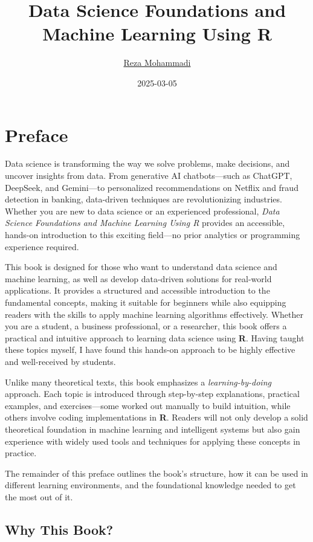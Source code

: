 \documentclass[
]{book}
\title{Data Science Foundations and Machine Learning Using R}
\author{\href{https://www.uva.nl/profile/a.mohammadi}{{Reza Mohammadi}}}
\date{2025-03-05}
\theoremstyle{definition}
\theoremstyle{definition}
\theoremstyle{definition}
\theoremstyle{definition}
\theoremstyle{remark}
\begin{document}
\maketitle

{
\setcounter{tocdepth}{1}
\tableofcontents
}
\chapter*{Preface}\label{preface}

Data science is transforming the way we solve problems, make decisions, and uncover insights from data. From generative AI chatbots---such as ChatGPT, DeepSeek, and Gemini---to personalized recommendations on Netflix and fraud detection in banking, data-driven techniques are revolutionizing industries. Whether you are new to data science or an experienced professional, \emph{Data Science Foundations and Machine Learning Using R} provides an accessible, hands-on introduction to this exciting field---no prior analytics or programming experience required.

This book is designed for those who want to understand data science and machine learning, as well as develop data-driven solutions for real-world applications. It provides a structured and accessible introduction to the fundamental concepts, making it suitable for beginners while also equipping readers with the skills to apply machine learning algorithms effectively. Whether you are a student, a business professional, or a researcher, this book offers a practical and intuitive approach to learning data science using \textbf{R}. Having taught these topics myself, I have found this hands-on approach to be highly effective and well-received by students.

Unlike many theoretical texts, this book emphasizes a \emph{learning-by-doing} approach. Each topic is introduced through step-by-step explanations, practical examples, and exercises---some worked out manually to build intuition, while others involve coding implementations in \textbf{R}. Readers will not only develop a solid theoretical foundation in machine learning and intelligent systems but also gain experience with widely used tools and techniques for applying these concepts in practice.

The remainder of this preface outlines the book's structure, how it can be used in different learning environments, and the foundational knowledge needed to get the most out of it.

\section*{Why This Book?}\label{why-this-book}
\end{document}
